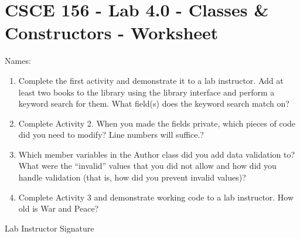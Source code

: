\documentclass[12pt]{scrartcl}
\begin{document}
\section*{CSCE 156 - Lab 4.0 - Classes \& Constructors - Worksheet}

Names: \underline{\hspace{10cm}}

\begin{enumerate}
  \item Complete the first activity and demonstrate it to a lab 
  instructor.  Add at least two books to the library using the 
  library interface and perform a keyword search for them.  
  What field(s) does the keyword search match on?
  
  \item Complete Activity 2.  When you made the fields private, 
  which pieces of code did you need to modify?  Line numbers will 
  suffice.?
  \item Which member variables in the Author class did you add data 
  validation to?  What were the ``invalid'' values that you did not 
  allow and how did you handle validation (that is, how did you 
  prevent invalid values)?
  
  \item Complete Activity 3 and demonstrate working code to a lab 
  instructor.  How old is War and Peace? 
\end{enumerate}

Lab Instructor Signature\underline{\hspace{7.5cm}}
\end{document}
